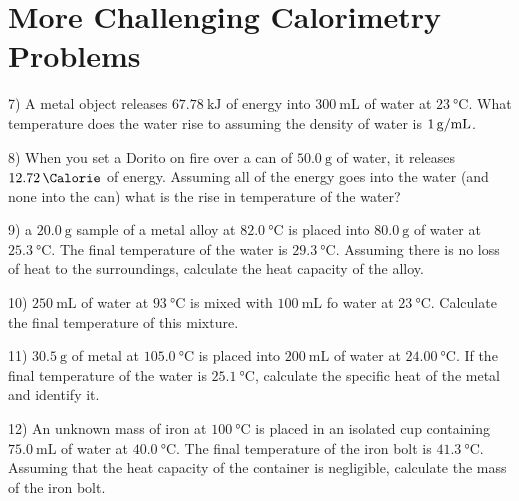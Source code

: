 \documentclass[12pt, oneside, letterpaper]{book}
\begin{document}
\section{More Challenging Calorimetry Problems}
7) A metal object releases $\qty{67.78}{\kilo\joule}$ of energy into $\qty{300} {\mL}$ of water at $\qty{23} {\degreeCelsius}$. What temperature does the water rise to assuming the density of water is $\qty[per-mode=fraction]{1}{\gram\per{\milli\liter}}$.

8) When you set a Dorito on fire over a can of $\qty{50.0} {\gram}$ of water, it releases $\qty{12.72}{\Calorie}$ of energy. Assuming all of the energy goes into the water (and none into the can) what is the rise in temperature of the water?

9) a $\qty{20.0}{\gram}$ sample of a metal alloy at $\qty{82.0}{\degreeCelsius}$ is placed into $\qty{80.0}{\gram}$ of water at $\qty{25.3}{\degreeCelsius}$. The final temperature of the water is $\qty{29.3}{\degreeCelsius}$. Assuming there is no loss of heat to the surroundings, calculate the heat capacity of the alloy.

10) $\qty{250}{\mL}$ of water at $\qty{93}{\degreeCelsius}$ is mixed with $\qty{100}{\mL}$ fo water at $\qty{23} {\degreeCelsius}$. Calculate the final temperature of this mixture.

11) $\qty{30.5}{\gram}$ of metal at $\qty{105.0}{\degreeCelsius}$ is placed into $\qty{200}{\mL}$ of water at $\qty{24.00} {\degreeCelsius}$. If the final temperature of the water is $\qty{25.1}{\degreeCelsius}$, calculate the specific heat of the metal and identify it.

12) An unknown mass of iron at $\qty{100}{\degreeCelsius}$ is placed in an isolated cup containing $\qty{75.0}{\mL}$ of water at $\qty{40.0}{\degreeCelsius}$. The final temperature of the iron bolt is $\qty{41.3}{\degreeCelsius}$. Assuming that the heat capacity of the container is negligible, calculate the mass of the iron bolt.
\end{document}
